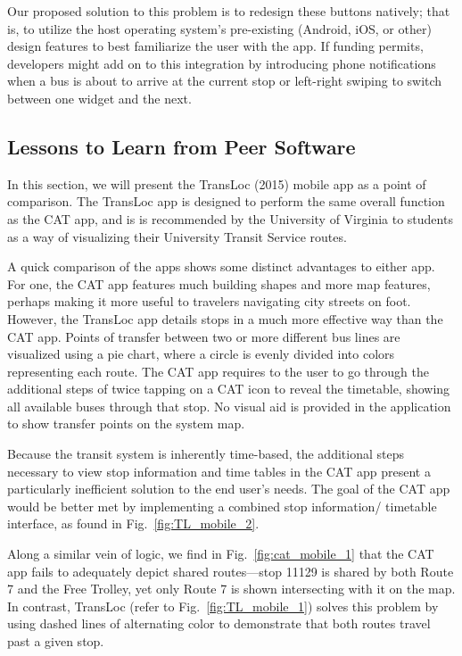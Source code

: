 \documentclass[12pt,letterpaper]{article}
\begin{document}
Our proposed solution to this problem is to redesign these
buttons natively; that is, to utilize the host operating system's pre-existing
(Android, iOS, or other) design features to best familiarize the user with the
app. If funding permits, developers might add on to this integration by
introducing phone notifications when a bus is about to arrive at the
current stop or left-right swiping to switch between one widget and the next.

\subsection{Lessons to Learn from Peer Software}
In this section, we will present the TransLoc (2015) mobile app as a point of
comparison. The TransLoc app is designed to perform the same overall
function as the CAT app, and is is recommended by the University of Virginia
to students as a way of visualizing their University Transit Service routes.

A quick comparison of the apps shows some distinct advantages to either app.
For one, the CAT app features much building shapes and more map features,
perhaps making it more useful to travelers navigating city streets on foot.
However, the TransLoc app details stops in a much more effective way than
the CAT app. Points of transfer between two or more different bus lines are
visualized using a pie chart, where a circle is evenly divided into colors
representing each route. The CAT app requires to the user to go through the
additional steps of twice tapping on a CAT icon to reveal the timetable,
showing all available buses through that stop. No visual aid is provided in
the application to show transfer points on the system map.

Because the transit system is inherently time-based, the additional steps
necessary to view stop information and time tables in the CAT app present
a particularly inefficient solution to the end user's needs. The goal of
the CAT app would be better met by implementing a combined stop information/%
timetable interface, as found in Fig.~\ref{fig:TL_mobile_2}.

Along a similar vein of logic, we find in Fig.~\ref{fig:cat_mobile_1} that the
CAT app fails to adequately depict shared routes---stop \textnumero{}11129 is
shared by both Route 7 and the Free Trolley, yet only Route 7 is shown
intersecting with it on the map. In contrast, TransLoc (refer to
Fig.~\ref{fig:TL_mobile_1}) solves this problem by using dashed lines of
alternating color to demonstrate that both routes travel past a given stop.
\end{document}
